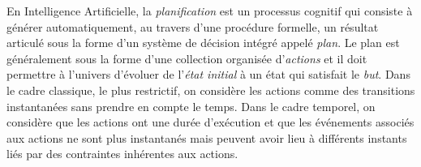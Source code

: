
En Intelligence Artificielle, la \emph{planification} est un processus cognitif qui consiste à générer automatiquement, au travers d'une procédure formelle, un résultat articulé sous la forme d'un système de décision intégré appelé \emph{plan}. Le plan est généralement sous la forme d'une collection organisée d'\emph{actions} et il doit permettre à l'univers d'évoluer de l'\emph{état initial} à un état qui satisfait le \emph{but}. Dans le cadre classique, le plus restrictif, on considère les actions comme des transitions instantanées sans prendre en compte le temps.
Dans le cadre temporel, on considère que les actions ont une durée d'exécution et que les événements associés aux actions ne sont plus instantanés mais peuvent avoir lieu à différents instants liés par des contraintes inhérentes aux actions.



